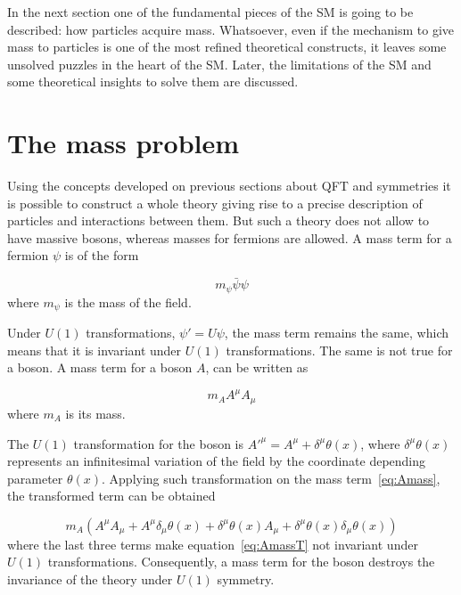 In the next section one of the fundamental pieces of the SM is going to be described: how particles acquire mass. Whatsoever, even if the mechanism to give mass to particles is one of the most refined theoretical constructs, it leaves some unsolved puzzles in the heart of the SM. Later, the limitations of the SM and some theoretical insights to solve them are discussed.

\section{The mass problem}
\label{sec:mass}

Using the concepts developed on previous sections about QFT and symmetries it is possible to construct a whole theory giving rise to a precise description of particles and interactions between them. But such a theory does not allow to have massive bosons, whereas masses for fermions are allowed. A mass term for a fermion $\psi$ is of the form 

\begin{equation*}
  m_{\psi}\bar{\psi}\psi
\end{equation*} where $m_{\psi}$ is the mass of the field.

Under $U(1)$ transformations, $\psi'=U \psi$, the mass term remains the same, which means that it is invariant under $U(1)$ transformations. The same is not true for a boson. A mass term for a boson $A$, can be written as 

\begin{equation}
  \label{eq:Amass}
  m_{A}A^{\mu}A_{\mu}
\end{equation} where $m_{A}$ is its mass.

The $U(1)$ transformation for the boson is $A'^{\mu}=A^{\mu}+\delta^{\mu}\theta(x)$, where $\delta^{\mu}\theta(x)$ represents an infinitesimal variation of the field by the coordinate depending parameter $\theta(x)$. Applying such transformation on the mass term~\ref{eq:Amass}, the transformed term can be obtained

\begin{equation}
  \label{eq:AmassT}
  m_{A}\left(A^{\mu}A_{\mu}+A^{\mu}\delta_{\mu}\theta(x)+\delta^{\mu}\theta(x)A_{\mu}+\delta^{\mu}\theta(x)\delta_{\mu}\theta(x)\right)
\end{equation}where the last three terms make equation~\ref{eq:AmassT} not invariant under $U(1)$ transformations. Consequently, a mass term for the boson destroys the invariance of the theory under $U(1)$ symmetry.


